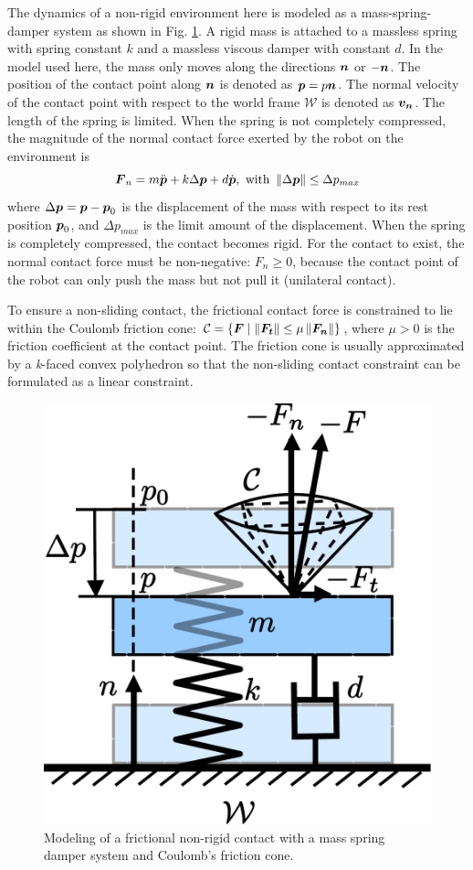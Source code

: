 \documentclass[letterpaper, 10 pt, conference]{ieeeconf}  %
\newcommand{\vect}[1]{\mbox{\boldmath${#1}$}}%
\begin{document}
The dynamics of a non-rigid environment here is modeled as a mass-spring-damper system as shown in Fig. \ref{contact_model}. A rigid mass is attached to a massless spring with spring constant $k$ and a massless viscous damper with constant $d$. In the model used here, the mass only moves along the directions $\vect{n}$ or $-\vect{n}$. The position of the contact point along $\vect{n}$ is denoted as $\vect{p}=p\vect{n}$. The normal velocity of the contact point with respect to the world frame $\mathcal{W}$ is denoted as $\vect{v_n}$.
The length of the spring is limited.
When the spring is not completely compressed, the magnitude of the normal contact force exerted by the robot on the environment is 
\begin{equation}
\vect{F}_n = m\ddot{\vect{p}}+k \Delta \vect{p} +d\dot{\vect{p}}, 
\ \text{with} \ \left\|\Delta \vect{p}\right\| \leq \Delta p_{max}
\end{equation} 
where  $\Delta \vect{p} = \vect{p} - \vect{p}_0$ is the displacement of the mass with respect to its rest position $\vect{p}_0$, and $\Delta p_{max}$ is the limit amount of the displacement. 
When the spring is completely compressed, the contact becomes rigid.
For the contact to exist, the normal contact force must be non-negative: $F_n\geq 0$, because the contact point of the robot can only push the mass but not pull it (unilateral contact). 


To ensure a non-sliding contact, the frictional contact force is constrained to lie within the Coulomb friction cone: $\mathcal{C} = \left\{\vect{F} \mid \left\|\vect{F_t}\right\|\leq \mu \left\|\vect{F_n}\right\|\right\}$, where $\mu>0$ is the friction coefficient at the contact point. The friction cone is usually approximated by a \textit{k}-faced convex polyhedron so that the non-sliding contact constraint can be formulated as a linear constraint.
\begin{figure}[!t]
\centering
\vspace{5pt}
\includegraphics[width=0.6\linewidth]{../figure/mass_spring_damper.pdf}
\caption{Modeling of a frictional non-rigid contact with a mass spring damper system and Coulomb's friction cone.}
\label{contact_model}
\end{figure}
\end{document}

